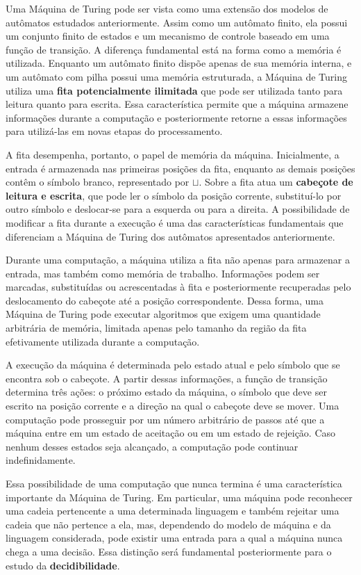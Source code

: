 \documentclass[
  brazilian,
  letterpaper,
]{book}
\theoremstyle{plain}
\theoremstyle{definition}
\theoremstyle{remark}
\begin{document}
Uma Máquina de Turing pode ser vista como uma extensão dos modelos de
autômatos estudados anteriormente. Assim como um autômato finito, ela
possui um conjunto finito de estados e um mecanismo de controle baseado
em uma função de transição. A diferença fundamental está na forma como a
memória é utilizada. Enquanto um autômato finito dispõe apenas de sua
memória interna, e um autômato com pilha possui uma memória estruturada,
a Máquina de Turing utiliza uma \textbf{fita potencialmente ilimitada}
que pode ser utilizada tanto para leitura quanto para escrita. Essa
característica permite que a máquina armazene informações durante a
computação e posteriormente retorne a essas informações para utilizá-las
em novas etapas do processamento.

A fita desempenha, portanto, o papel de memória da máquina.
Inicialmente, a entrada é armazenada nas primeiras posições da fita,
enquanto as demais posições contêm o símbolo branco, representado por
\(\sqcup\). Sobre a fita atua um \textbf{cabeçote de leitura e escrita},
que pode ler o símbolo da posição corrente, substituí-lo por outro
símbolo e deslocar-se para a esquerda ou para a direita. A possibilidade
de modificar a fita durante a execução é uma das características
fundamentais que diferenciam a Máquina de Turing dos autômatos
apresentados anteriormente.

Durante uma computação, a máquina utiliza a fita não apenas para
armazenar a entrada, mas também como memória de trabalho. Informações
podem ser marcadas, substituídas ou acrescentadas à fita e
posteriormente recuperadas pelo deslocamento do cabeçote até a posição
correspondente. Dessa forma, uma Máquina de Turing pode executar
algoritmos que exigem uma quantidade arbitrária de memória, limitada
apenas pelo tamanho da região da fita efetivamente utilizada durante a
computação.

A execução da máquina é determinada pelo estado atual e pelo símbolo que
se encontra sob o cabeçote. A partir dessas informações, a função de
transição determina três ações: o próximo estado da máquina, o símbolo
que deve ser escrito na posição corrente e a direção na qual o cabeçote
deve se mover. Uma computação pode prosseguir por um número arbitrário
de passos até que a máquina entre em um estado de aceitação ou em um
estado de rejeição. Caso nenhum desses estados seja alcançado, a
computação pode continuar indefinidamente.

Essa possibilidade de uma computação que nunca termina é uma
característica importante da Máquina de Turing. Em particular, uma
máquina pode reconhecer uma cadeia pertencente a uma determinada
linguagem e também rejeitar uma cadeia que não pertence a ela, mas,
dependendo do modelo de máquina e da linguagem considerada, pode existir
uma entrada para a qual a máquina nunca chega a uma decisão. Essa
distinção será fundamental posteriormente para o estudo da
\textbf{decidibilidade}.
\end{document}
